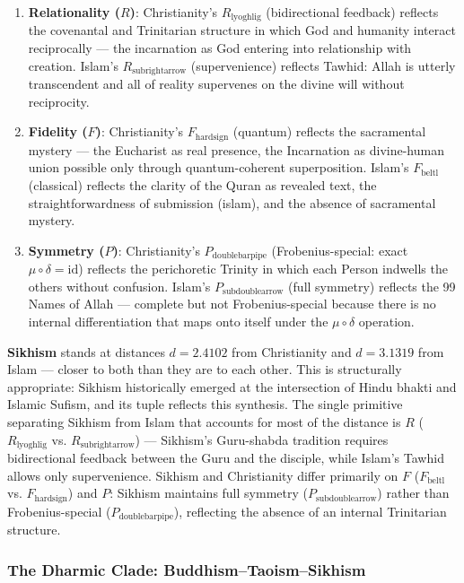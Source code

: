 \documentclass[12pt,a4paper]{article}
\begin{document}
\begin{enumerate}
    \item \textbf{Relationality ($R$)}: Christianity's $R_{\text{lyoghlig}}$ (bidirectional feedback) reflects the covenantal and Trinitarian structure in which God and humanity interact reciprocally --- the incarnation as God entering into relationship with creation. Islam's $R_{\text{subrightarrow}}$ (supervenience) reflects Tawhid: Allah is utterly transcendent and all of reality supervenes on the divine will without reciprocity.
    \item \textbf{Fidelity ($F$)}: Christianity's $F_{\text{hardsign}}$ (quantum) reflects the sacramental mystery --- the Eucharist as real presence, the Incarnation as divine-human union possible only through quantum-coherent superposition. Islam's $F_{\text{beltl}}$ (classical) reflects the clarity of the Quran as revealed text, the straightforwardness of submission (islam), and the absence of sacramental mystery.
    \item \textbf{Symmetry ($P$)}: Christianity's $P_{\text{doublebarpipe}}$ (Frobenius-special: exact $\mu\circ\delta = \text{id}$) reflects the perichoretic Trinity in which each Person indwells the others without confusion. Islam's $P_{\text{subdoublearrow}}$ (full symmetry) reflects the 99 Names of Allah --- complete but not Frobenius-special because there is no internal differentiation that maps onto itself under the $\mu\circ\delta$ operation.
\end{enumerate}

\textbf{Sikhism} stands at distances $d = 2.4102$ from Christianity and $d = 3.1319$ from Islam --- closer to both than they are to each other. This is structurally appropriate: Sikhism historically emerged at the intersection of Hindu bhakti and Islamic Sufism, and its tuple reflects this synthesis. The single primitive separating Sikhism from Islam that accounts for most of the distance is $R$ ($R_{\text{lyoghlig}}$ vs. $R_{\text{subrightarrow}}$) --- Sikhism's Guru-shabda tradition requires bidirectional feedback between the Guru and the disciple, while Islam's Tawhid allows only supervenience. Sikhism and Christianity differ primarily on $F$ ($F_{\text{beltl}}$ vs. $F_{\text{hardsign}}$) and $P$: Sikhism maintains full symmetry ($P_{\text{subdoublearrow}}$) rather than Frobenius-special ($P_{\text{doublebarpipe}}$), reflecting the absence of an internal Trinitarian structure.

\subsubsection{The Dharmic Clade: Buddhism--Taoism--Sikhism}
\end{document}
